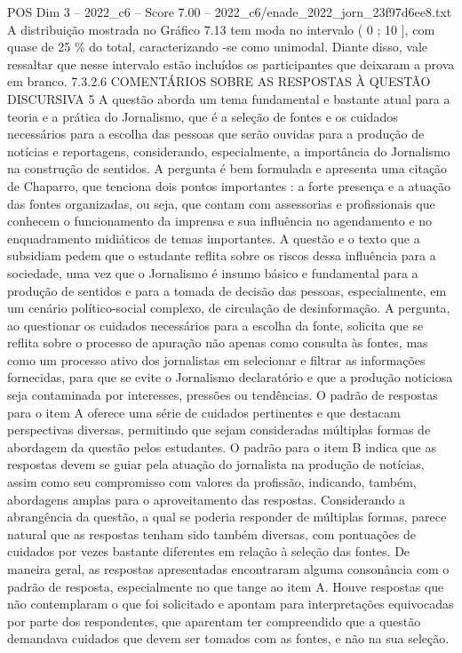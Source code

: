 \begin{textsample}{POS Dim 3 – 2022\_c6 – Score 7.00 – 2022\_c6/enade\_2022\_jorn\_23f97d6ee8.txt}
A distribuição mostrada no Gráfico 7.13 tem moda no intervalo ( 0 ; 10 ], com quase de 25 \% do total, caracterizando -se como unimodal.
Diante disso, vale ressaltar que nesse intervalo estão incluídos os participantes que deixaram a prova em branco. 7.3.2.6 COMENTÁRIOS SOBRE AS RESPOSTAS À QUESTÃO DISCURSIVA 5 A questão aborda um tema fundamental e bastante atual para a teoria e a prática do Jornalismo, que é a seleção de fontes e os cuidados necessários para a escolha das pessoas que serão ouvidas para a produção de notícias e reportagens, considerando, especialmente, a importância do Jornalismo na construção de sentidos.
A pergunta é bem formulada e apresenta uma citação de Chaparro, que tenciona dois pontos importantes : a forte presença e a atuação das fontes organizadas, ou seja, que contam com assessorias e profissionais que conhecem o funcionamento da imprensa e sua influência no agendamento e no enquadramento midiáticos de temas importantes.
A questão e o texto que a subsidiam pedem que o estudante reflita sobre os riscos dessa influência para a sociedade, uma vez que o Jornalismo é insumo básico e fundamental para a produção de sentidos e para a tomada de decisão das pessoas, especialmente, em um cenário político-social complexo, de circulação de desinformação.
A pergunta, ao questionar os cuidados necessários para a escolha da fonte, solicita que se reflita sobre o processo de apuração não apenas como consulta às fontes, mas como um processo ativo dos jornalistas em selecionar e filtrar as informações fornecidas, para que se evite o Jornalismo declaratório e que a produção noticiosa seja contaminada por interesses, pressões ou tendências.
O padrão de respostas para o item A oferece uma série de cuidados pertinentes e que destacam perspectivas diversas, permitindo que sejam consideradas múltiplas formas de abordagem da questão pelos estudantes.
O padrão para o item B indica que as respostas devem se guiar pela atuação do jornalista na produção de notícias, assim como seu compromisso com valores da profissão, indicando, também, abordagens amplas para o aproveitamento das respostas.
Considerando a abrangência da questão, a qual se poderia responder de múltiplas formas, parece natural que as respostas tenham sido também diversas, com pontuações de cuidados por vezes bastante diferentes em relação à seleção das fontes.
De maneira geral, as respostas apresentadas encontraram alguma consonância com o padrão de resposta, especialmente no que tange ao item A.
Houve respostas que não contemplaram o que foi solicitado e apontam para interpretações equivocadas por parte dos respondentes, que aparentam ter compreendido que a questão demandava cuidados que devem ser tomados com as fontes, e não na sua seleção.

\end{textsample}
